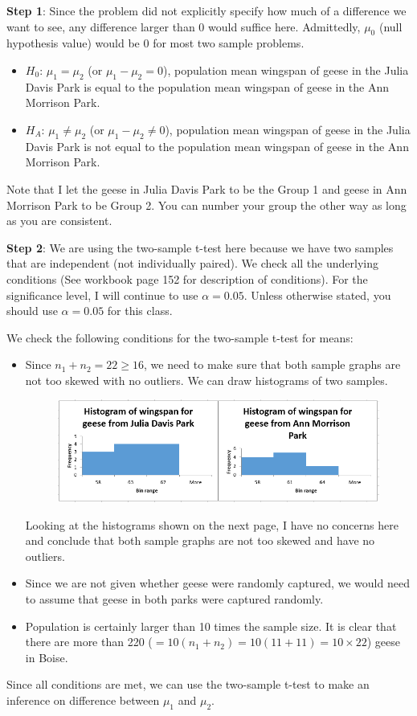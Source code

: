 \documentclass[12pt]{article}
\begin{document}
\noindent \textbf{Step 1}: Since the problem did not explicitly specify how much of a difference we want to see, any difference larger than 0 would suffice here. Admittedly, $\mu_0$ (null hypothesis value) would be 0 for most two sample problems.
\begin{itemize}
	\item $H_0$: $\mu_1 = \mu_2$ (or $\mu_1 - \mu_2 = 0$), population mean wingspan of geese in the Julia Davis Park is equal to the population mean wingspan of geese in the Ann Morrison Park.
	\item $H_A$: $\mu_1 \neq \mu_2$ (or $\mu_1 - \mu_2 \neq 0$), population mean wingspan of geese in the Julia Davis Park is not equal to the population mean wingspan of geese in the Ann Morrison Park.
\end{itemize}
Note that I let the geese in Julia Davis Park to be the Group 1 and geese in Ann Morrison Park to be Group 2. You can number your group the other way as long as you are consistent.

\noindent \textbf{Step 2}: We are using the two-sample t-test here because we have two samples that are independent (not individually paired). We check all the underlying conditions (See workbook page 152 for description of conditions). For the significance level, I will continue to use $\alpha = 0.05$. Unless otherwise stated, you should use $\alpha = 0.05$ for this class.

We check the following conditions for the two-sample t-test for means:
\begin{itemize}
	\item Since $n_1 + n_2 = 22 \geq 16$, we need to make sure that both sample graphs are not too skewed with no outliers. We can draw histograms of two samples.
	
	\begin{figure}[!h]
		\centering
		\includegraphics[width=15cm]{Figures/fig4.png}
		\vspace{-5 pt}
	\end{figure}
	
	Looking at the histograms shown on the next page, I have no concerns here and conclude that both sample graphs are not too skewed and have no outliers.
	\item Since we are not given whether geese were randomly captured, we would need to assume that geese in both parks were captured randomly.
	\item Population is certainly larger than 10 times the sample size. It is clear that there are more than 220 ($=10 (n_1 + n_2)=10 (11+11) = 10 \times 22$) geese in Boise.
\end{itemize}
Since all conditions are met, we can use the two-sample t-test to make an inference on difference between $\mu_1$ and $\mu_2$.
\end{document}
